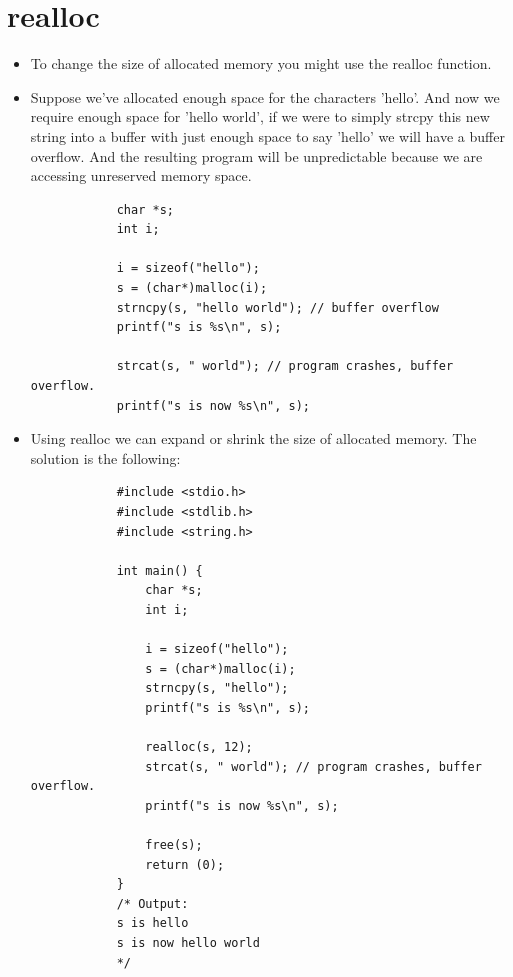 \section{realloc}
\begin{itemize}
    \item To change the size of allocated memory you might use the realloc function.
    \item Suppose we've allocated enough space for the characters 'hello'. And now we require enough space for 'hello world', if we were to simply strcpy this new string into a buffer with just enough space to say 'hello' we will have a buffer overflow. And the resulting program will be unpredictable because we are accessing unreserved memory space.
        \begin{verbatim}
            char *s;
            int i;

            i = sizeof("hello");
            s = (char*)malloc(i);
            strncpy(s, "hello world"); // buffer overflow
            printf("s is %s\n", s);

            strcat(s, " world"); // program crashes, buffer overflow.
            printf("s is now %s\n", s);
        \end{verbatim}

    \item Using realloc we can expand or shrink the size of allocated memory. The solution is the following:
        \begin{verbatim}
            #include <stdio.h>
            #include <stdlib.h>
            #include <string.h>

            int main() {
                char *s;
                int i;

                i = sizeof("hello");
                s = (char*)malloc(i);
                strncpy(s, "hello");
                printf("s is %s\n", s);

                realloc(s, 12);
                strcat(s, " world"); // program crashes, buffer overflow.
                printf("s is now %s\n", s);

                free(s);
                return (0);
            }
            /* Output:
            s is hello
            s is now hello world
            */
        \end{verbatim}
\end{itemize}


